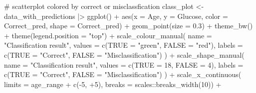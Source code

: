 \documentclass[
  english,
  11pt,
]{article}
\newenvironment{Shaded}{\begin{snugshade}}{\end{snugshade}}
\newcommand{\AttributeTok}[1]{\textcolor[rgb]{0.40,0.45,0.13}{#1}}
\newcommand{\CommentTok}[1]{\textcolor[rgb]{0.37,0.37,0.37}{#1}}
\newcommand{\DecValTok}[1]{\textcolor[rgb]{0.68,0.00,0.00}{#1}}
\newcommand{\FloatTok}[1]{\textcolor[rgb]{0.68,0.00,0.00}{#1}}
\newcommand{\FunctionTok}[1]{\textcolor[rgb]{0.28,0.35,0.67}{#1}}
\newcommand{\NormalTok}[1]{\textcolor[rgb]{0.00,0.23,0.31}{#1}}
\newcommand{\OtherTok}[1]{\textcolor[rgb]{0.00,0.23,0.31}{#1}}
\newcommand{\SpecialCharTok}[1]{\textcolor[rgb]{0.37,0.37,0.37}{#1}}
\newcommand{\StringTok}[1]{\textcolor[rgb]{0.13,0.47,0.30}{#1}}
\begin{document}
\begin{Shaded}
\begin{Highlighting}[]
  \CommentTok{\# scatterplot colored by correct or misclassfication}
\NormalTok{  class\_plot }\OtherTok{\textless{}{-}}
\NormalTok{    data\_with\_predictions }\SpecialCharTok{|\textgreater{}}
    \FunctionTok{ggplot}\NormalTok{() }\SpecialCharTok{+}
    \FunctionTok{aes}\NormalTok{(}\AttributeTok{x =}\NormalTok{ Age, }\AttributeTok{y =}\NormalTok{ Glucose, }\AttributeTok{color =}\NormalTok{ Correct\_pred, }\AttributeTok{shape =}\NormalTok{ Correct\_pred) }\SpecialCharTok{+}
    \FunctionTok{geom\_point}\NormalTok{(}\AttributeTok{size =} \FloatTok{0.3}\NormalTok{) }\SpecialCharTok{+}
    \FunctionTok{theme\_bw}\NormalTok{() }\SpecialCharTok{+}
    \FunctionTok{theme}\NormalTok{(}\AttributeTok{legend.position =} \StringTok{"top"}\NormalTok{) }\SpecialCharTok{+}
    \FunctionTok{scale\_colour\_manual}\NormalTok{(}
      \AttributeTok{name =} \StringTok{"Classification result"}\NormalTok{,}
      \AttributeTok{values =} \FunctionTok{c}\NormalTok{(}\StringTok{\textasciigrave{}}\AttributeTok{TRUE}\StringTok{\textasciigrave{}} \OtherTok{=} \StringTok{"green"}\NormalTok{, }\StringTok{\textasciigrave{}}\AttributeTok{FALSE}\StringTok{\textasciigrave{}} \OtherTok{=} \StringTok{"red"}\NormalTok{),}
      \AttributeTok{labels =} \FunctionTok{c}\NormalTok{(}\StringTok{\textasciigrave{}}\AttributeTok{TRUE}\StringTok{\textasciigrave{}} \OtherTok{=} \StringTok{"Correct"}\NormalTok{, }\StringTok{\textasciigrave{}}\AttributeTok{FALSE}\StringTok{\textasciigrave{}} \OtherTok{=} \StringTok{"Misclassification"}\NormalTok{)}
\NormalTok{    ) }\SpecialCharTok{+}
    \FunctionTok{scale\_shape\_manual}\NormalTok{(}
      \AttributeTok{name =} \StringTok{"Classification result"}\NormalTok{,}
      \AttributeTok{values =} \FunctionTok{c}\NormalTok{(}\StringTok{\textasciigrave{}}\AttributeTok{TRUE}\StringTok{\textasciigrave{}} \OtherTok{=} \DecValTok{18}\NormalTok{, }\StringTok{\textasciigrave{}}\AttributeTok{FALSE}\StringTok{\textasciigrave{}} \OtherTok{=} \DecValTok{4}\NormalTok{),}
      \AttributeTok{labels =} \FunctionTok{c}\NormalTok{(}\StringTok{\textasciigrave{}}\AttributeTok{TRUE}\StringTok{\textasciigrave{}} \OtherTok{=} \StringTok{"Correct"}\NormalTok{, }\StringTok{\textasciigrave{}}\AttributeTok{FALSE}\StringTok{\textasciigrave{}} \OtherTok{=} \StringTok{"Misclassification"}\NormalTok{)}
\NormalTok{    ) }\SpecialCharTok{+}
    \FunctionTok{scale\_x\_continuous}\NormalTok{(}
      \AttributeTok{limits =}\NormalTok{ age\_range }\SpecialCharTok{+} \FunctionTok{c}\NormalTok{(}\SpecialCharTok{{-}}\DecValTok{5}\NormalTok{, }\SpecialCharTok{+}\DecValTok{5}\NormalTok{),}
      \AttributeTok{breaks =}\NormalTok{ scales}\SpecialCharTok{::}\FunctionTok{breaks\_width}\NormalTok{(}\DecValTok{10}\NormalTok{)) }\SpecialCharTok{+}

\end{Highlighting}
\end{Shaded}
\end{document}
